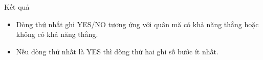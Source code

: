 Kết quả  
\begin{itemize}
	\item     Dòng thứ nhất ghi YES/NO tương ứng với quân mă có khả năng thắng hoặc không có khả năng thắng.   
	\item     Nếu dòng thứ nhất là YES thì dòng thứ hai ghi số bước ít nhất.   
\end{itemize}
